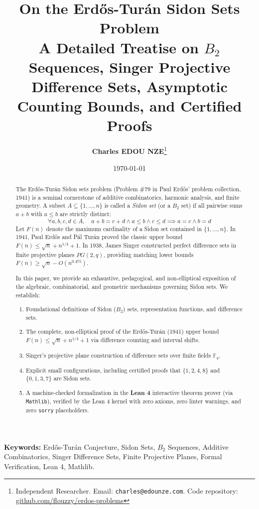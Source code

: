 \documentclass[11pt,a4paper]{article}
\title{\textbf{\Large On the Erd\H{o}s-Tur\'an Sidon Sets Problem}\\[0.5em]
\large A Detailed Treatise on $B_2$ Sequences, Singer Projective Difference Sets, Asymptotic Counting Bounds, and Certified Proofs}
\author{\textbf{Charles EDOU NZE}\thanks{Independent Researcher. Email: \texttt{charles@edounze.com}. Code repository: \href{https://github.com/flouzzy/erdos-problems}{github.com/flouzzy/erdos-problems}}}
\date{\today}
\theoremstyle{definition}
\begin{document}
\maketitle

\begin{abstract}
The Erd\H{o}s-Tur\'an Sidon sets problem (Problem \#79 in Paul Erd\H{o}s' problem collection, 1941) is a seminal cornerstone of additive combinatorics, harmonic analysis, and finite geometry. A subset $A \subseteq \{1, \dots, n\}$ is called a \emph{Sidon set} (or a $B_2$ set) if all pairwise sums $a + b$ with $a \le b$ are strictly distinct:
\[ \forall a, b, c, d \in A, \quad a + b = c + d \land a \le b \land c \le d \implies a = c \land b = d \]
Let $F(n)$ denote the maximum cardinality of a Sidon set contained in $\{1, \dots, n\}$. In 1941, Paul Erd\H{o}s and P\'al Tur\'an proved the classic upper bound $F(n) \le \sqrt{n} + n^{1/4} + 1$. In 1938, James Singer constructed perfect difference sets in finite projective planes $PG(2, q)$, providing matching lower bounds $F(n) \ge \sqrt{n} - O(n^{0.475})$.

In this paper, we provide an exhaustive, pedagogical, and non-elliptical exposition of the algebraic, combinatorial, and geometric mechanisms governing Sidon sets. We establish:
\begin{enumerate}
    \item Foundational definitions of Sidon ($B_2$) sets, representation functions, and difference sets.
    \item The complete, non-elliptical proof of the Erd\H{o}s-Tur\'an (1941) upper bound $F(n) \le \sqrt{n} + n^{1/4} + 1$ via difference counting and interval shifts.
    \item Singer's projective plane construction of difference sets over finite fields $\mathbb{F}_q$.
    \item Explicit small configurations, including certified proofs that $\{1, 2, 4, 8\}$ and $\{0, 1, 3, 7\}$ are Sidon sets.
    \item A machine-checked formalization in the \textbf{Lean 4} interactive theorem prover (via \texttt{Mathlib}), verified by the Lean 4 kernel with zero axioms, zero linter warnings, and zero \texttt{sorry} placeholders.
\end{enumerate}
\end{abstract}

\vspace{0.5em}
\noindent\textbf{Keywords:} Erd\H{o}s-Tur\'an Conjecture, Sidon Sets, $B_2$ Sequences, Additive Combinatorics, Singer Difference Sets, Finite Projective Planes, Formal Verification, Lean 4, Mathlib.
\end{document}
